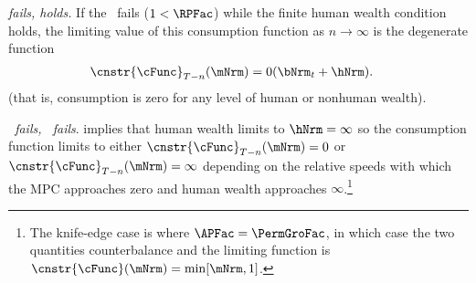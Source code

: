 \documentclass[\econtexRoot/BufferStockTheory]{subfiles}
\begin{document}
\hypertarget{cnclGICRawcnclRICFHWC}{}

\textit{{\RIC} fails, {\FHWC} holds.} If the \RIC~fails ($1 < \RPFac$) while the finite human wealth condition
holds, the limiting value of this consumption function as $n \rightarrow
\infty$ is the degenerate function
\begin{equation}\begin{gathered}\begin{aligned}
  \cnstr{\cFunc}_{T-n}(\mNrm)  & = 0 (\bNrm_{t}+\hNrm).
\end{aligned}\end{gathered}\end{equation}
(that is, consumption is zero for any level of human or nonhuman wealth).

\hypertarget{cnclGICRawcnclRICcnclFHWC}{}

\textit{{\RIC}~fails, {\FHWC}~fails}.
{\cncl{\FHWC}} implies that human wealth limits to $\hNrm =
\infty$ so the consumption function limits to either
$\cnstr{\cFunc}_{T-n}(\mNrm) = 0$ or
$\cnstr{\cFunc}_{T-n}(\mNrm) = \infty$ depending on the relative
speeds with which the MPC approaches zero and human wealth approaches
$\infty$.\footnote{The knife-edge case is where $\APFac = \PermGroFac$, in
  which case the two quantities counterbalance and the limiting
  function is $\cnstr{\cFunc}(\mNrm)=\min[\mNrm,1]$.}

\let\TableWidth\relax
{\newlength\TableWidth}
\end{document}
